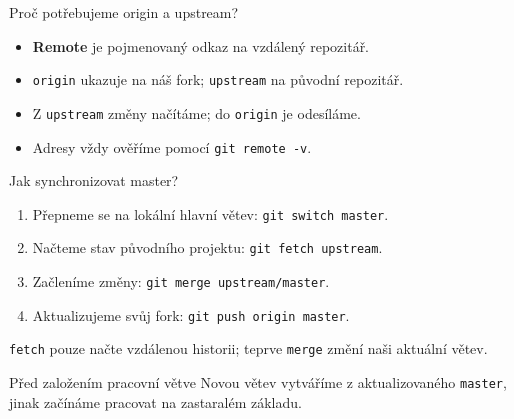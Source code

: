 \documentclass[aspectratio=169]{beamer}
\newcommand{\term}[1]{\textcolor{CodeBlue}{\textbf{#1}}}
\begin{document}
\begin{frame}{Proč potřebujeme origin a upstream?}
  \centering
  \vspace{0.4cm}
  \begin{itemize}
    \item \term{Remote} je pojmenovaný odkaz na vzdálený repozitář.
    \item \texttt{origin} ukazuje na náš fork; \texttt{upstream} na původní repozitář.
    \item Z \texttt{upstream} změny načítáme; do \texttt{origin} je odesíláme.
    \item Adresy vždy ověříme pomocí \texttt{git remote -v}.
  \end{itemize}
\end{frame}

\begin{frame}{Jak synchronizovat master?}
  \begin{enumerate}
    \item Přepneme se na lokální hlavní větev: \texttt{git switch master}.
    \item Načteme stav původního projektu: \texttt{git fetch upstream}.
    \item Začleníme změny: \texttt{git merge upstream/master}.
    \item Aktualizujeme svůj fork: \texttt{git push origin master}.
  \end{enumerate}
  \texttt{fetch} pouze načte vzdálenou historii; teprve \texttt{merge} změní
  naši aktuální větev.
  \vspace{0.2cm}
  \begin{alertblock}{Před založením pracovní větve}
    Novou větev vytváříme z aktualizovaného \texttt{master}, jinak začínáme
    pracovat na zastaralém základu.
  \end{alertblock}
\end{frame}
\end{document}

